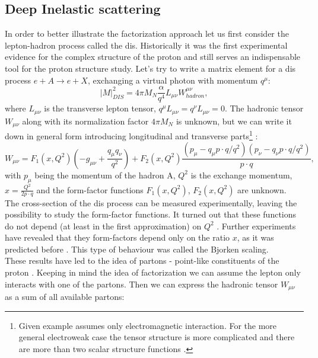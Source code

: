 		\subsection{Deep Inelastic scattering}
		In order to better illustrate the factorization approach let us first consider the lepton-hadron process called the \gls{dis}. Historically it was the first experimental evidence for the complex structure of the proton and still serves an indispensable tool for the proton structure study. Let's try to write a matrix element for a \gls{dis} process $e+A\rightarrow e+X$, exchanging a virtual photon with momentum $q^{\mu}$:
		 \begin{equation}
		|M|^2_{DIS}=4\pi M_N\frac{\alpha}{q^4}L_{\mu \nu}W^{\mu \nu}_{hadron},
		\end{equation}
		where $L_{\mu \nu}$ is the transverse lepton tensor, $q^{\mu}L_{\mu \nu}=q^{\nu}L_{\mu \nu}=0$. The hadronic tensor $W_{\mu \nu}$ along with its normalization factor $4\pi M_N$ is unknown, but we can write it down in general form introducing longitudinal and transverse parts\footnote{Given example assumes only electromagnetic interaction. For the more general electroweak case the tensor structure is more complicated and there are more than two scalar structure functions \cite{proton_struct}.} \cite{factorization}:
		\begin{equation}
		W_{\mu \nu}=F_1(x,Q^2)\left(-g_{\mu \nu}+\frac{q_{\mu}q_{\nu}}{q^2}\right)+F_2(x,Q^2)\frac{\left(p_{\mu}-q_{\mu}p\cdot q / q^2\right)\left(p_{\nu}-q_{\nu}p\cdot q / q^2\right)}{p\cdot q},
		\end{equation}
		with $p_{\mu}$ being the momentum of the hadron A, $Q^2$ is the exchange momentum, $x=\frac{Q^2}{2p \cdot q }$ and the form-factor functions $F_1(x,Q^2)$, $F_2(x,Q^2)$ are unknown. \\
		The cross-section of the \gls{dis} process can be measured experimentally, leaving the possibility to study the form-factor functions. It turned out that these functions do not depend (at least in the first approximation) on $Q^2$ \cite{dis}. Further experiments have revealed that they form-factors depend only on the ratio $x$, as it was predicted before \cite{bjorken}. This type of behaviour was called the Bjorken scaling.\\
		These results have led to the idea of partons - point-like constituents of the proton \cite{feynman_partons}. Keeping in mind the idea of factorization we can assume the lepton only interacts with one of the partons. Then we can express the hadronic tensor $W_{\mu \nu}$ as a sum of all available partons:
